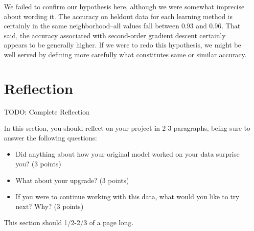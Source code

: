 \documentclass[11pt]{extarticle}
\begin{document}
We failed to confirm our hypothesis here, although we were somewhat imprecise about wording it. The accuracy on heldout data for each learning method is certainly in the same neighborhood--all values fall between 0.93 and 0.96. That said, the accuracy associated with second-order gradient descent certainly appears to be generally higher. If we were to redo this hypothesis, we might be well served by defining more carefully what constitutes same or similar accuracy.

\newpage

\section{Reflection}

TODO: Complete Reflection

In this section, you should reflect on your project in 2-3 paragraphs, being sure to answer the following questions:
\begin{itemize}
	\item Did anything about how your original model worked on your data surprise you? (3 points)
	\item What about your upgrade? (3 points)
	\item If you were to continue working with this data, what would you like to try next?  Why? (3 points)
\end{itemize}

This section should 1/2-2/3 of a page long.
\end{document}
